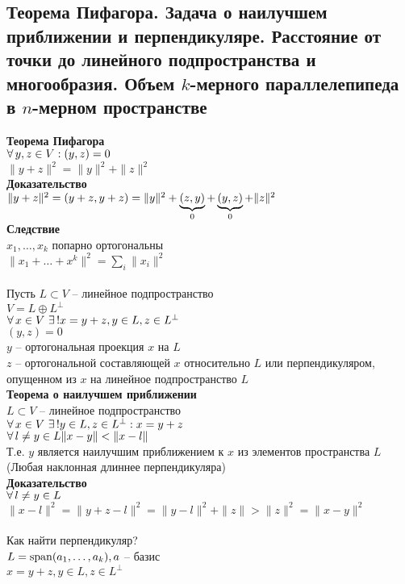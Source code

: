 \documentclass[12pt]{article}
\begin{document}
\subsection{Теорема Пифагора. Задача о наилучшем приближении и перпендикуляре. Расстояние от точки до линейного подпространства и многообразия. Объем $k$-мерного параллелепипеда в $n$-мерном пространстве}
\textbf{Теорема Пифагора}\\
$\fall y,z \in V: (y, z) = 0$\\
$\|y+z\|^2 = \|y\|^2 + \|z\|^2$\\
\textbf{Доказательство}\\
$\|y+z\|^2 = (y+z, y+z) = \|y\|^2 + \ub0{(z,y)} + \ub0{(y,z)} + \|z\|^2$\\
\textbf{Следствие}\\
$x_1, \ldots, x_k$ попарно ортогональны\\
$\|x_1 + \ldots + x^k\|^2 = \sum_i \|x_i\|^2$\\\\
Пусть $L \subset V$ -- линейное подпространство\\
$V = L \oplus L^\perp$\\
$\fall x \in V\ \ex! x=y+z, y\in L, z \in L^\perp$\\
$(y,z) = 0$\\
$y$ -- ортогональная проекция $x$ на $L$\\
$z$ -- ортогональной составляющей $x$ относительно $L$ или перпендикуляром, опущенном из $x$ на линейное подпространство $L$\\
\textbf{Теорема о наилучшем приближении}\\
$L \subset V$ -- линейное подпространство\\
$\fall x \in V\ \ex! y\in L, z \in L^\perp: x = y+z$\\
$\fall l\neq y \in L \|x-y\|< \|x-l\|$\\
Т.е. $y$ является наилучшим приближением к $x$ из элементов пространства $L$\\
(Любая наклонная длиннее перпендикуляра)\\
\textbf{Доказательство}\\
$\fall l \neq y \in L$\\
$\| x - l \|^2 = \|y + z - l\|^2 = \|y-l\|^2 + \|z\| > \|z\|^2 = \|x-y\|^2$\\\\
Как найти перпендикуляр?\\
$L = \span(a_1, \ldots, a_k), a$ -- базис\\
$x = y + z, y \in L, z \in L^\perp$\\
\end{document}
